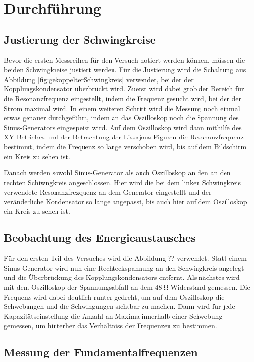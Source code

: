 \section{Durchführung}

\subsection{Justierung der Schwingkreise}

Bevor die ersten Messreihen für den Versuch notiert werden können, müssen die beiden
Schwingkreise justiert werden. Für die Justierung wird die Schaltung aus Abbildung \ref{fig:gekoppelterSchwingkreis}
verwendet, bei der der Kopplungskondensator überbrückt wird. Zuerst wird dabei
grob der Bereich für die Resonanzfrequenz eingestellt,
indem die Frequenz gesucht wird, bei der der Strom maximal wird. In einem weiteren
Schritt wird die Messung noch einmal etwas genauer durchgeführt, indem an das
Oszilloskop noch die Spannung des Sinus-Generators eingespeist wird. Auf dem Oszilloskop
wird dann mithilfe des XY-Betriebes und der Betrachtung der Lissajous-Figuren die
Resonanzfrequenz bestimmt, indem die Frequenz so lange verschoben wird, bis auf
dem Bildschirm ein Kreis zu sehen ist.

Danach werden sowohl Sinus-Generator als
auch Oszilloskop an den an den rechten Schiwngkreis angeschlossen. Hier wird die
bei dem linken Schwingkreis verwendete Resonanzfrezquenz an dem Generator eingestellt
und der veränderliche Kondensator so lange angepasst, bis auch hier auf dem Oszilloskop
ein Kreis zu sehen ist.

\subsection{Beobachtung des Energieaustausches}

Für den ersten Teil des Versuches wird die Abbildung ?? verwendet. Statt einem
Sinus-Generator wird nun eine Rechteckspannung an den Schwingkreis angelegt und
die Überbrückung des Kopplungskondensators entfernt. Als nächstes wird mit dem
Oszilloskop der Spannungsabfall an dem $\SI{48}{\ohm}$ Widerstand gemessen.
Die Frequenz wird dabei deutlich runter gedreht, um auf dem Oszilloskop
die Schwebungen und die Schwingungen sichtbar zu machen.
Dann wird für jede Kapazitätseinstellung die Anzahl an Maxima innerhalb einer
Schwebung gemessen, um hinterher das Verhältniss der Frequenzen zu bestimmen.

\subsection{Messung der Fundamentalfrequenzen}

